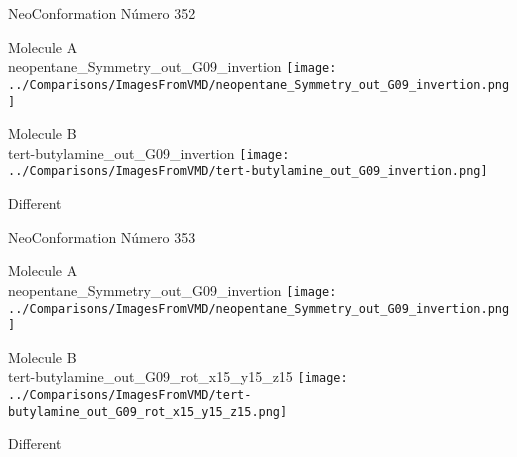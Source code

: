  \newpage

\vtab[-3cm]
\begin{center}
{\large NeoConformation \tab Número 352}
\end{center}
\begin{multicols}{2}
\begin{center}
Molecule A \\ 
neopentane\_Symmetry\_out\_G09\_invertion
\texttt{[image: ../Comparisons/ImagesFromVMD/neopentane\_Symmetry\_out\_G09\_invertion.png]}
\\
\vtab

\columnbreak
Molecule B \\ 
tert-butylamine\_out\_G09\_invertion
\texttt{[image: ../Comparisons/ImagesFromVMD/tert-butylamine\_out\_G09\_invertion.png]}
\\
\vtab


\end{center}
\end{multicols}
\begin{center}
\textcolor{NavyBlue}{\Large Different}
\end{center}

 \newpage

\vtab[-3cm]
\begin{center}
{\large NeoConformation \tab Número 353}
\end{center}
\begin{multicols}{2}
\begin{center}
Molecule A \\ 
neopentane\_Symmetry\_out\_G09\_invertion
\texttt{[image: ../Comparisons/ImagesFromVMD/neopentane\_Symmetry\_out\_G09\_invertion.png]}
\\
\vtab

\columnbreak
Molecule B \\ 
tert-butylamine\_out\_G09\_rot\_x15\_y15\_z15
\texttt{[image: ../Comparisons/ImagesFromVMD/tert-butylamine\_out\_G09\_rot\_x15\_y15\_z15.png]}
\\
\vtab


\end{center}
\end{multicols}
\begin{center}
\textcolor{NavyBlue}{\Large Different}
\end{center}

 \newpage

